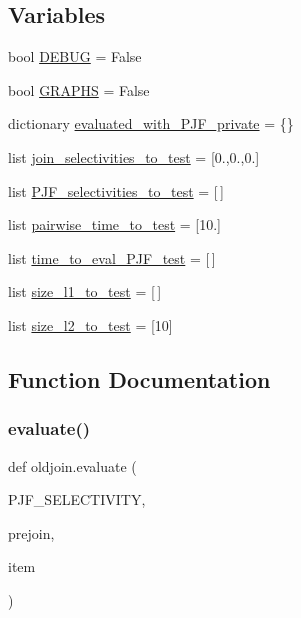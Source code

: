 \subsection*{Variables}
\begin{DoxyCompactItemize}
\item 
bool \hyperlink{namespaceoldjoin_a117352cc494cc62c6b2f1882786a332c}{D\+E\+B\+UG} = False
\item 
bool \hyperlink{namespaceoldjoin_ab5b4f2bc5eb9b59855ac5b3251d83665}{G\+R\+A\+P\+HS} = False
\item 
dictionary \hyperlink{namespaceoldjoin_a92c0c194b6eaa00d63e4140804ffd6bf}{evaluated\+\_\+with\+\_\+\+P\+J\+F\+\_\+private} = \{\}
\item 
list \hyperlink{namespaceoldjoin_a5d84f12721d822ed265b6dee7a9e48a4}{join\+\_\+selectivities\+\_\+to\+\_\+test} = \mbox{[}0.,0.,0.\mbox{]}
\item 
list \hyperlink{namespaceoldjoin_a1eeb4af9ab535277cade5d3f16902166}{P\+J\+F\+\_\+selectivities\+\_\+to\+\_\+test} = \mbox{[}$\,$\mbox{]}
\item 
list \hyperlink{namespaceoldjoin_ad1a622991eb6c5dfe180fa4ec1aa1c49}{pairwise\+\_\+time\+\_\+to\+\_\+test} = \mbox{[}10.\mbox{]}
\item 
list \hyperlink{namespaceoldjoin_a5072c2af4042665dbe9d3ee2f3620596}{time\+\_\+to\+\_\+eval\+\_\+\+P\+J\+F\+\_\+test} = \mbox{[}$\,$\mbox{]}
\item 
list \hyperlink{namespaceoldjoin_a633a4b5ea8e51c8a8122d22a96a6e5c9}{size\+\_\+l1\+\_\+to\+\_\+test} = \mbox{[}$\,$\mbox{]}
\item 
list \hyperlink{namespaceoldjoin_a4e7b91dbb88e6f12875dcd0d1fbe731d}{size\+\_\+l2\+\_\+to\+\_\+test} = \mbox{[}10\mbox{]}
\end{DoxyCompactItemize}


\subsection{Function Documentation}
\mbox{\label{namespaceoldjoin_a8b76cd232f566a0726e27b9e31cdd045}} 
\subsubsection{\texorpdfstring{evaluate()}{evaluate()}}
{\footnotesize\ttfamily def oldjoin.\+evaluate (\begin{DoxyParamCaption}\item[{}]{P\+J\+F\+\_\+\+S\+E\+L\+E\+C\+T\+I\+V\+I\+TY,  }\item[{}]{prejoin,  }\item[{}]{item }\end{DoxyParamCaption})}

